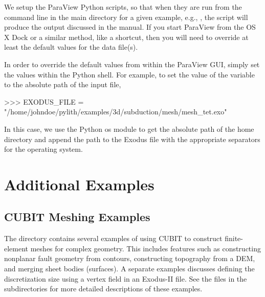 We setup the ParaView Python scripts, so that when they are run from
the command line in the main directory for a given example, e.g.,
, the script will produce the output
discussed in the manual. If you start ParaView from the OS X Dock or a
similar method, like a shortcut, then you will need to override at
least the default values for the data file(s).

In order to override the default values from within the ParaView GUI,
simply set the values within the Python shell. For example, to set the
value of the variable  to the absolute path of
the input file,
\begin{python}
>>> EXODUS_FILE = "/home/johndoe/pylith/examples/3d/subduction/mesh/mesh_tet.exo"
\end{python}
In this case, we use the Python os module to get the absolute path of
the home directory and append the path to the Exodus file with the
appropriate separators for the operating system.

















\section{Additional Examples}


\subsection{CUBIT Meshing Examples}

The directory  contains several examples
of using CUBIT to construct finite-element meshes for complex geometry.
This includes features such as constructing nonplanar fault geometry
from contours, constructing topography from a DEM, and merging sheet
bodies (surfaces). A separate examples discusses defining the discretization
size using a vertex field in an Exodus-II file. See the 
files in the subdirectories for more detailed descriptions of these
examples.



